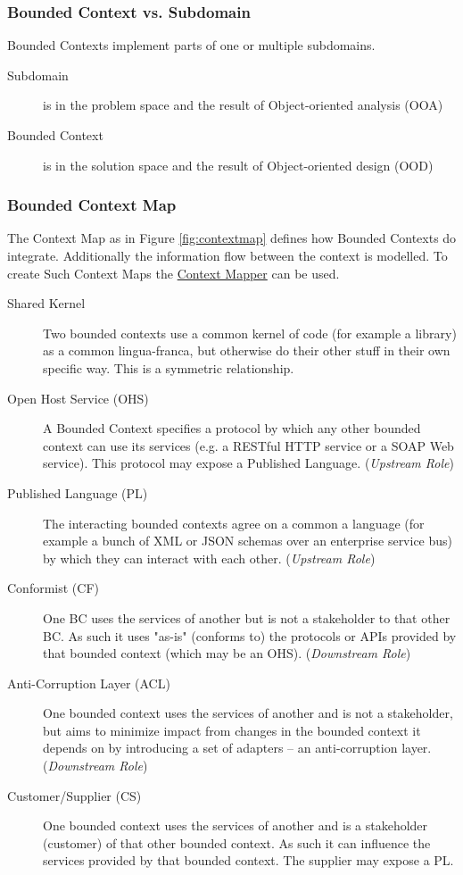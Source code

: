 \subsubsection{Bounded Context vs. Subdomain}
Bounded Contexts implement parts of one or multiple subdomains.

\begin{description}
  \item [Subdomain] is in the problem space and the result of Object-oriented analysis (OOA)
  \item [Bounded Context] is in the solution space and the result of Object-oriented design (OOD)
\end{description}

\subsubsection{Bounded Context Map}
The Context Map as in Figure \ref{fig:contextmap} defines how Bounded Contexts do integrate. Additionally the information flow between the context is modelled.  To create Such Context Maps the \href{https://contextmapper.org/}{Context Mapper} can be used.

\begin{description}
  \item [Shared Kernel] Two bounded contexts use a common kernel of code (for example a library) as a common lingua-franca, but otherwise do their other stuff in their own specific way. This is a symmetric relationship.
  \item [Open Host Service (OHS)] A Bounded Context specifies a protocol by which any other bounded context can use its services (e.g. a RESTful HTTP service or a SOAP Web service). This protocol may expose a Published Language. (\textit{Upstream Role})
  \item [Published Language (PL)] The interacting bounded contexts agree on a common a language (for example a bunch of XML or JSON schemas over an enterprise service bus) by which they can interact with each other. (\textit{Upstream Role})
  \item [Conformist (CF)] One BC uses the services of another but is not a stakeholder to that other BC. As such it uses "as-is" (conforms to) the protocols or APIs provided by that bounded context (which may be an OHS). (\textit{Downstream Role})
  \item [Anti-Corruption Layer (ACL)] One bounded context uses the services of another and is not a stakeholder, but aims to minimize impact from changes in the bounded context it depends on by introducing a set of adapters – an anti-corruption layer. (\textit{Downstream Role})
  \item [Customer/Supplier (CS)]  One bounded context uses the services of another and is a stakeholder (customer) of that other bounded context. As such it can influence the services provided by that bounded context. The supplier may expose a PL.
\end{description}

